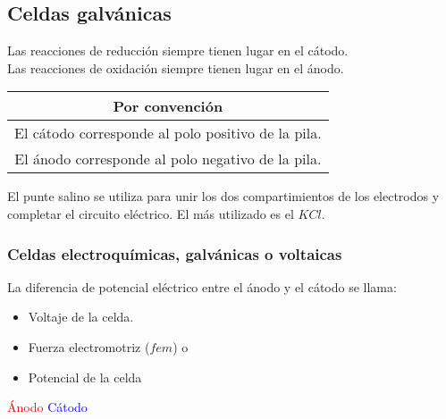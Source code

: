     \subsection{Celdas galvánicas}
        \sangria{} Las reacciones de reducción siempre tienen lugar en el cátodo. \\ \sangria{} Las reacciones de oxidación siempre tienen lugar en el ánodo.
        \begin{center}
            \begin{tabular}{|c|}
                \toprule
                \multicolumn{1}{c}{Por convención} \\ \midrule
                \multicolumn{1}{c}{El cátodo corresponde al polo positivo de la pila.} \\
                \multicolumn{1}{c}{El ánodo corresponde al polo negativo de la pila.} \\ \bottomrule
            \end{tabular}
        \end{center}
        \sangria{} El punte salino se utiliza para unir los dos compartimientos de los electrodos y completar el circuito eléctrico. El más utilizado es el $KCl$.
        \subsubsection{Celdas electroquímicas, galvánicas o voltaicas}
        \sangria{} La diferencia de potencial eléctrico entre el ánodo y el cátodo se llama: \saltoPag{}
        \begin{itemize}
            \item Voltaje de la celda.
            \item Fuerza electromotriz ($fem$) o
            \item Potencial de la celda
        \end{itemize}
        \begin{center} \hspace{5pt}\textcolor{red}{Ánodo} \hspace{30pt}\textcolor{blue}{Cátodo} \end{center}

